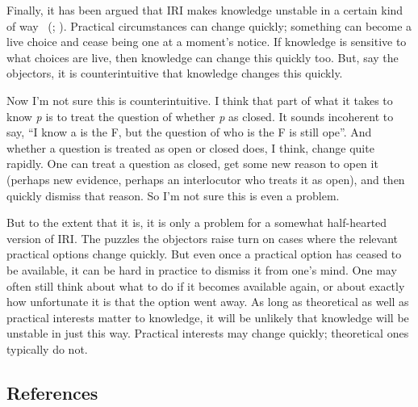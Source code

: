 \documentclass[
  11pt,
  letterpaper,
  DIV=11,
  numbers=noendperiod,
  twoside]{scrartcl}
\begin{document}
Finally, it has been argued that IRI makes knowledge unstable in a
certain kind of way ~(;
). Practical circumstances can
change quickly; something can become a live choice and cease being one
at a moment's notice. If knowledge is sensitive to what choices are
live, then knowledge can change this quickly too. But, say the
objectors, it is counterintuitive that knowledge changes this quickly.

Now I'm not sure this is counterintuitive. I think that part of what it
takes to know \emph{p} is to treat the question of whether \emph{p} as
closed. It sounds incoherent to say, ``I know a is the F, but the
question of who is the F is still ope''. And whether a question is
treated as open or closed does, I think, change quite rapidly. One can
treat a question as closed, get some new reason to open it (perhaps new
evidence, perhaps an interlocutor who treats it as open), and then
quickly dismiss that reason. So I'm not sure this is even a problem.

But to the extent that it is, it is only a problem for a somewhat
half-hearted version of IRI. The puzzles the objectors raise turn on
cases where the relevant practical options change quickly. But even once
a practical option has ceased to be available, it can be hard in
practice to dismiss it from one's mind. One may often still think about
what to do if it becomes available again, or about exactly how
unfortunate it is that the option went away. As long as theoretical as
well as practical interests matter to knowledge, it will be unlikely
that knowledge will be unstable in just this way. Practical interests
may change quickly; theoretical ones typically do not.

\subsection*{References}\label{references}
\end{document}
